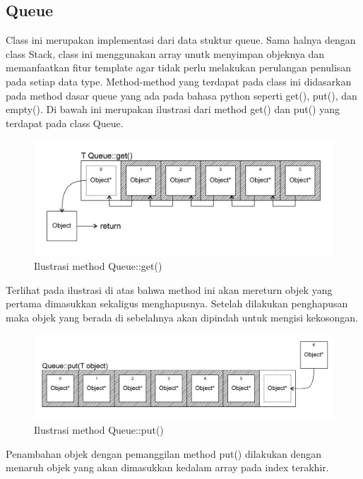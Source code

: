 \documentclass[]{article}
\begin{document}
\subsection{Queue}
\par
Class ini merupakan implementasi dari data stuktur queue. Sama halnya dengan class Stack, class ini menggunakan array unutk menyimpan objeknya dan memanfaatkan fitur template agar tidak perlu melakukan perulangan penulisan pada setiap data type.
Method-method yang terdapat pada class ini didasarkan pada method dasar queue yang ada pada bahasa python seperti get(), put(), dan empty(). Di bawah ini merupakan ilustrasi dari method get() dan put() yang terdapat pada class Queue.
\begin{figure}[htp]
    \centering
    \includegraphics[width=12cm]{queueget.png}
    \caption{Ilustrasi method Queue::get()}
    \label{fig:queueget}
\end{figure}
\par
Terlihat pada ilustrasi di atas bahwa method ini akan mereturn objek yang pertama dimasukkan sekaligus menghapusnya. Setelah dilakukan penghapusan maka objek yang berada di sebelahnya akan dipindah untuk mengisi kekosongan.
\begin{figure}[htp]
    \centering
    \includegraphics[width=12cm]{queueput.png}
    \caption{Ilustrasi method Queue::put()}
    \label{fig:queueput}
\end{figure}
\par
Penambahan objek dengan pemanggilan method put() dilakukan dengan menaruh objek yang akan dimasukkan kedalam array pada index terakhir.
\end{document}
